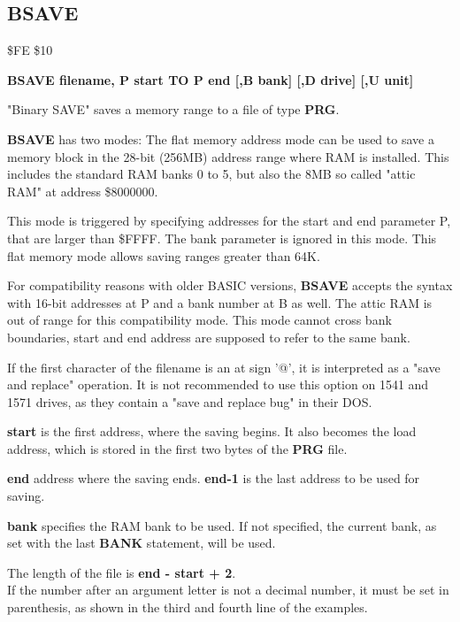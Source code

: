 \newpage
\subsection{BSAVE}
\begin{description}[leftmargin=2cm,style=nextline]
\item [Token:] \$FE \$10
\item [Format:] {\bf BSAVE filename, P start TO P end
                [,B bank] [,D drive] [,U unit] }
\item [Usage:]
   "Binary SAVE" saves a memory range to a file of type {\bf PRG}.

   {\bf BSAVE} has two modes:
   The flat memory address mode can be used to save a memory block
   in the 28-bit (256MB) address range where RAM is installed.
   This includes the standard RAM banks 0 to 5, but also
   the 8MB so called "attic RAM" at address \$8000000.

   This mode is triggered by specifying addresses for the start
   and end parameter P, that are
   larger than \$FFFF. The bank parameter is ignored in this mode.
   This flat memory mode allows saving ranges greater than 64K.

   For compatibility reasons with older BASIC versions, {\bf BSAVE}
   accepts the syntax with 16-bit addresses at P and a bank number at B as well.
   The attic RAM is out of range for this compatibility mode.
   This mode cannot cross bank boundaries, start and end address
   are supposed to refer to the same bank.


   \filenamedefinition
   If the first character of the filename is an at sign '@', it
   is interpreted as a "save and replace" operation. It is not recommended
   to use this option on 1541 and 1571 drives, as they
   contain a "save and replace bug" in their DOS.

    {\bf start} is the first address, where the saving begins.
    It also becomes the load address,
    which is stored in the first two bytes of the {\bf PRG} file.

   {\bf end} address where the saving ends.
   {\bf end-1} is the last address to be used for saving.

   {\bf bank} specifies the RAM bank to be used.
   If not specified, the current bank, as set with the last
   {\bf BANK} statement, will be used.

   \drivedefinition

   \unitdefinition

\item [Remarks:]
   The length of the file is {\bf end - start + 2}. \\
   If the number after an argument letter is not a decimal
   number, it must be set in parenthesis, as shown
   in the third and fourth line of the examples.


\end{description}
